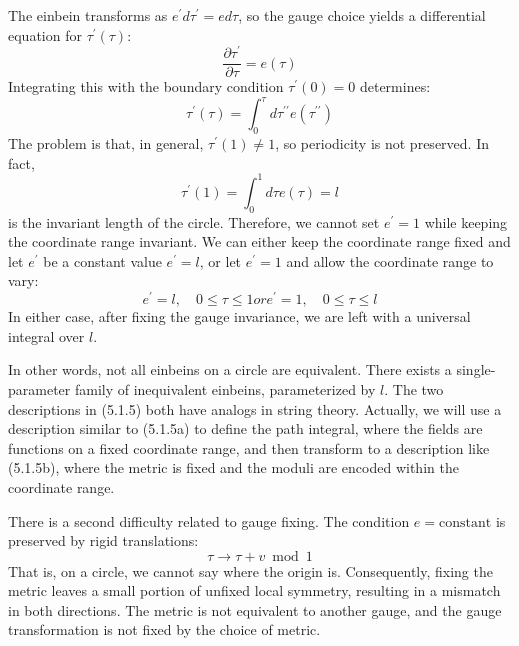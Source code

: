 The einbein transforms as $e^{\prime} d \tau^{\prime}=e d \tau$, so the gauge choice yields a differential equation for $\tau^{\prime}(\tau)$:
\begin{equation}
	\frac{\partial \tau^{\prime}}{\partial \tau}=e(\tau)
\end{equation}
Integrating this with the boundary condition $\tau^{\prime}(0)=0$ determines:
\begin{equation}
	\tau^{\prime}(\tau)=\int_{0}^{\tau} d \tau^{\prime \prime} e\left(\tau^{\prime \prime}\right)
\end{equation}
The problem is that, in general, $\tau^{\prime}(1) \neq 1$, so periodicity is not preserved. In fact,
\begin{equation}
	\tau^{\prime}(1)=\int_{0}^{1} d \tau e(\tau)=l
\end{equation}
is the invariant length of the circle. Therefore, we cannot set $e^{\prime}=1$ while keeping the coordinate range invariant. We can either keep the coordinate range fixed and let $e^{\prime}$ be a constant value $e^{\prime}=l$, or let $e^{\prime}=1$ and allow the coordinate range to vary:
\begin{subequations}
	\begin{equation}
		e^{\prime}=l, \quad 0 \leq \tau \leq 1
	\end{equation}
	or
	\begin{equation}
		e^{\prime}=1, \quad 0 \leq \tau \leq l
	\end{equation}\label{5.1.5}
\end{subequations}
In either case, after fixing the gauge invariance, we are left with a universal integral over $l$.

In other words, not all einbeins on a circle are equivalent. There exists a single-parameter family of inequivalent einbeins, parameterized by $l$. The two descriptions in (5.1.5) both have analogs in string theory. Actually, we will use a description similar to (5.1.5a) to define the path integral, where the fields are functions on a fixed coordinate range, and then transform to a description like (5.1.5b), where the metric is fixed and the moduli are encoded within the coordinate range.

There is a second difficulty related to gauge fixing. The condition $e = \text{constant}$ is preserved by rigid translations:
\begin{equation}
	\tau \rightarrow \tau+v \bmod 1
\end{equation}
That is, on a circle, we cannot say where the origin is. Consequently, fixing the metric leaves a small portion of unfixed local symmetry, resulting in a mismatch in both directions. The metric is not equivalent to another gauge, and the gauge transformation is not fixed by the choice of metric.

